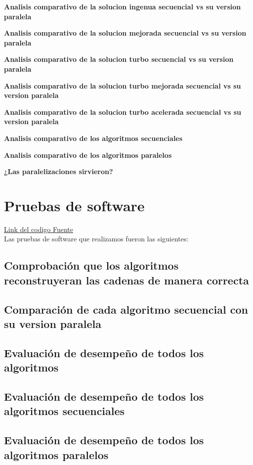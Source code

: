 \documentclass[conference]{IEEEtran}
\begin{document}
\textbf{Analisis comparativo de la solucion ingenua secuencial vs su version paralela}

\textbf{Analisis comparativo de la solucion mejorada secuencial vs su version paralela}

\textbf{Analisis comparativo de la solucion turbo secuencial vs su version paralela}

\textbf{Analisis comparativo de la solucion turbo mejorada secuencial vs su version paralela}

\textbf{Analisis comparativo de la solucion turbo acelerada secuencial vs su version paralela}

\textbf{Analisis comparativo de los algoritmos secuenciales}

\textbf{Analisis comparativo de los algoritmos paralelos}

\textbf{¿Las paralelizaciones sirvieron?}

\section{\textbf{Pruebas de software}}

\href{https://github.com/vicmaHo/proyecto-PF}
{Link del codigo Fuente} \\

Las pruebas de software que realizamos fueron las siguientes:

\subsection{Comprobación que los algoritmos reconstruyeran las cadenas de manera correcta}
\subsection{Comparación de cada algoritmo secuencial con su version paralela}
\subsection{Evaluación de desempeño de todos los algoritmos}
\subsection{Evaluación de desempeño de todos los algoritmos secuenciales}
\subsection{Evaluación de desempeño de todos los algoritmos paralelos}

 
\end{document}
